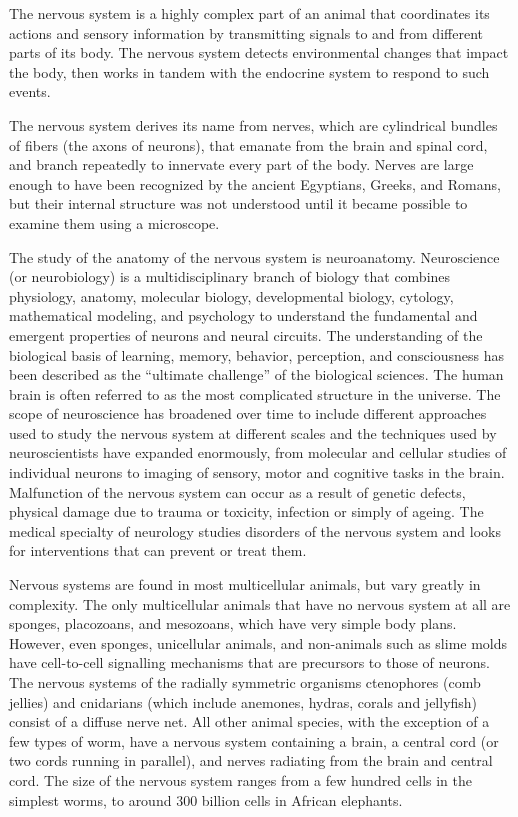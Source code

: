 The nervous system is a highly complex part of an animal that coordinates its actions and sensory information by transmitting signals to and from different parts of its body. The nervous system detects environmental changes that impact the body, then works in tandem with the endocrine system to respond to such events.

The nervous system derives its name from nerves, which are cylindrical bundles of fibers (the axons of neurons), that emanate from the brain and spinal cord, and branch repeatedly to innervate every part of the body. Nerves are large enough to have been recognized by the ancient Egyptians, Greeks, and Romans, but their internal structure was not understood until it became possible to examine them using a microscope.

The study of the anatomy of the nervous system is neuroanatomy. Neuroscience (or neurobiology) is a multidisciplinary branch of biology that combines physiology, anatomy, molecular biology, developmental biology, cytology, mathematical modeling, and psychology to understand the fundamental and emergent properties of neurons and neural circuits. The understanding of the biological basis of learning, memory, behavior, perception, and consciousness has been described as the ``ultimate challenge'' of the biological sciences. The human brain is often referred to as the most complicated structure in the universe. The scope of neuroscience has broadened over time to include different approaches used to study the nervous system at different scales and the techniques used by neuroscientists have expanded enormously, from molecular and cellular studies of individual neurons to imaging of sensory, motor and cognitive tasks in the brain. Malfunction of the nervous system can occur as a result of genetic defects, physical damage due to trauma or toxicity, infection or simply of ageing. The medical specialty of neurology studies disorders of the nervous system and looks for interventions that can prevent or treat them.

Nervous systems are found in most multicellular animals, but vary greatly in complexity. The only multicellular animals that have no nervous system at all are sponges, placozoans, and mesozoans, which have very simple body plans. However, even sponges, unicellular animals, and non-animals such as slime molds have cell-to-cell signalling mechanisms that are precursors to those of neurons. The nervous systems of the radially symmetric organisms ctenophores (comb jellies) and cnidarians (which include anemones, hydras, corals and jellyfish) consist of a diffuse nerve net. All other animal species, with the exception of a few types of worm, have a nervous system containing a brain, a central cord (or two cords running in parallel), and nerves radiating from the brain and central cord. The size of the nervous system ranges from a few hundred cells in the simplest worms, to around 300 billion cells in African elephants.

